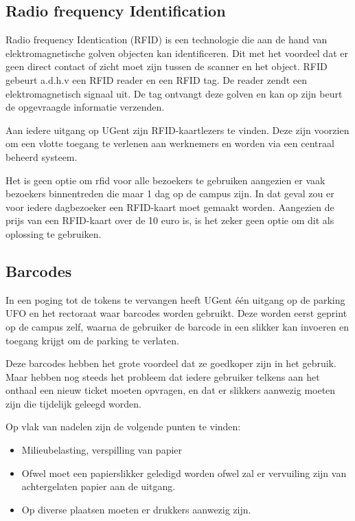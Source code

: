 \subsection{Radio frequency Identification}

Radio frequency Identication (RFID) is een technologie die aan de hand van elektromagnetische golven objecten kan identificeren. Dit met het voordeel dat er geen direct contact of zicht moet zijn tussen de scanner en het object. RFID gebeurt a.d.h.v een RFID reader en een RFID tag. De reader zendt een elektromagnetisch signaal uit. De tag ontvangt deze golven en kan op zijn beurt de opgevraagde informatie verzenden. \autocite{li2009design}

Aan iedere uitgang op UGent zijn RFID-kaartlezers te vinden. Deze zijn voorzien om een vlotte toegang te verlenen aan werknemers en worden via een centraal beheerd systeem.

Het is geen optie om rfid voor alle bezoekers te gebruiken aangezien er vaak bezoekers binnentreden die maar 1 dag op de campus zijn. In dat geval zou er voor iedere dagbezoeker een RFID-kaart moet gemaakt worden. Aangezien de prijs van een RFID-kaart over de 10 euro is, is het zeker geen optie om dit als oplossing te gebruiken.

\subsection{Barcodes}
In een poging tot de tokens te vervangen heeft UGent één uitgang op de parking UFO en het rectoraat waar barcodes worden gebruikt. Deze worden eerst geprint op de campus zelf, waarna de gebruiker de barcode in een slikker kan invoeren en toegang krijgt om de parking te verlaten.

Deze barcodes hebben het grote voordeel dat ze goedkoper zijn in het gebruik. Maar hebben nog steeds het probleem dat iedere gebruiker telkens aan het onthaal een nieuw ticket moeten opvragen, en dat er slikkers aanwezig moeten zijn die tijdelijk geleegd worden.

Op vlak van nadelen zijn de volgende punten te vinden:
\begin{itemize}
	\item Milieubelasting, verspilling van papier
	\item Ofwel moet een papierslikker geledigd worden ofwel zal er vervuiling zijn van achtergelaten papier aan de uitgang.
	\item Op diverse plaatsen moeten er drukkers aanwezig zijn.
\end{itemize}


